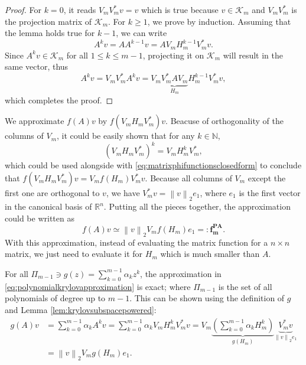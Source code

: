 \begin{proof}
    For $k=0$, it reads $V_m V_m^* v = v$ which is true because $v \in \mathcal{K}_m$
    and $V_m V_m^*$ is the projection matrix of $\mathcal{K}_m$.
    For $k \ge 1$, we prove by induction. Assuming that the lemma holds true for
    $k-1$, we can write
    \begin{equation*}
        A^{k} v = A A^{k-1} v = A V_m H_m^{k-1} V_m^* v.
    \end{equation*}
    Since $A^{k} v \in \mathcal{K}_m$ for all $1 \le k \le m-1$, projecting it on
    $\mathcal{K}_m$ will result in the same vector, thus
    \begin{equation*}
        A^{k} v = V_m V_m^* A^{k} v = V_m \underset{H_m}{\underbrace{V_m^* A V_m}} H_m^{k-1} V_m^* v,
    \end{equation*}
    which completes the proof.
\end{proof}

We approximate $f(A)v$ by $f(V_m H_m V_m^*)v$. Beacuse of orthogonality
of the columns of $V_m$, it could be easily shown that for any $k \in \mathbb{N}$,
\begin{equation*}
    \label{eq:reprojectionpower}
    (V_m H_m V_m^*)^{k} = V_m H_m^k V_m^*,
\end{equation*}
which could be used alongside with \eqref{eq:matrixphifunctionsclosedform} to conclude
that $f(V_m H_m V_m^*)v = V_m f(H_m) V_m^* v$.
Because all columns of $V_m$ except the first one are orthogonal to $v$, we have
$V_m^* v = \left\| v \right\|_{2} e_1$, where $e_1$ is the first vector in the
canonical basis of $\mathbb{R}^n$.
Putting all the pieces together, the approximation could be written as
\begin{equation}
    \label{eq:polynomialkrylovapproximation}
    f(A)v \simeq \left\| v \right\|_{2} V_m f(H_m) e_1 =: \mathbf{f_{m}^{PA}}.
\end{equation}
With this approximation, instead of evaluating the matrix function for
a $n \times n$ matrix, we just need to evaluate it for $H_m$ which is much
smaller than $A$.

\begin{corollary}
    \label{cor:univariateerrorestimationpolynomial}
    For all $\Pi_{m-1} \ni g(z) = \sum_{k=0}^{m-1}{\alpha_k} z^k$, the approximation
    in \eqref{eq:polynomialkrylovapproximation} is exact;
    where $\Pi_{m-1}$ is the set of all polynomials of degree up to $m-1$.
    This can be shown using the definition of $g$ and Lemma \ref{lem:krylovsubspacepowered}:
    \begin{equation*}
        \begin{aligned}
            g(A) v & = \sum_{k=0}^{m-1}{\alpha_k A^k v}
            = \sum_{k=0}^{m-1}{\alpha_k V_m H_m^k V_m^* v}
            = V_m \underset{g(H_m)}{\underbrace{\left( \sum_{k=0}^{m-1}{\alpha_k H_m^k } \right)}}
            \underset{\left\| v \right\|_2 e_1}{\underbrace{V_m^* v}}\\
            & = \left\| v \right\|_2 V_m g(H_m) e_1.
        \end{aligned}
    \end{equation*}
\end{corollary}


